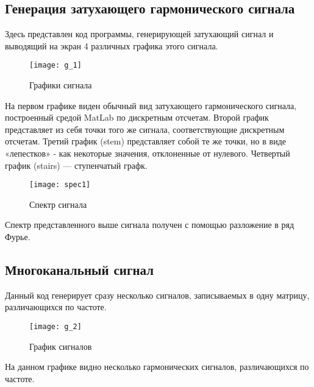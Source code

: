 \subsection{Генерация затухающего гармонического сигнала}


\parindent=1cm
Здесь представлен код программы, генерирующей затухающий сигнал и выводящий на экран 4 различных графика этого сигнала.

\begin{figure}[H]
	\begin{center}
		\texttt{[image: g\_1]}
		\caption{Графики сигнала} 
		\label{pic:g_1} %
	\end{center}
\end{figure}
На первом графике виден обычный вид затухающего гармонического сигнала, построенный средой MatLab по дискретным отсчетам. Второй график представляет из себя точки того же сигнала, соответствующие дискретным отсчетам. Третий график (stem) представляет собой те же точки, но в виде «лепестков» - как некоторые значения, отклоненные от нулевого. Четвертый график (stairs) — ступенчатый графк.

\begin{figure}[H]
	\begin{center}
		\texttt{[image: spec1]}
		\caption{Спектр сигнала} 
		\label{pic:spec1} %
	\end{center}
\end{figure}
Спектр представленного выше сигнала получен с помощью разложение в ряд Фурье.

\subsection{Многоканальный сигнал}


\parindent=1cm
Данный код генерирует сразу несколько сигналов, записываемых в одну матрицу, различающихся по частоте.

\begin{figure}[H]
	\begin{center}
		\texttt{[image: g\_2]}
		\caption{График сигналов} 
		\label{pic:g_2} %
	\end{center}
\end{figure}
На данном графике видно несколько гармонических сигналов, различающихся по частоте.


